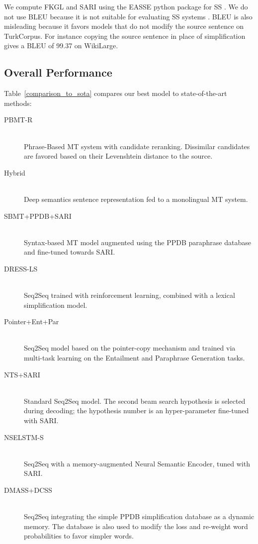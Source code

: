 \documentclass[10pt, a4paper]{article}
\begin{document}
    
    
    
    

We compute FKGL and SARI using the EASSE python package for SS \cite{alva2019easse}.
We do not use BLEU because it is not suitable for evaluating SS systems \cite{sulem2018bleu}.
BLEU is also misleading because it favors models that do not modify the source sentence \cite{xu2016optimizing} on TurkCorpus. For instance copying the source sentence in place of simplification gives a BLEU of 99.37 on WikiLarge.



\subsection{Overall Performance}



Table~\ref{comparison_to_sota} compares our best model to state-of-the-art methods:
\begin{description}
  \item [PBMT-R] \cite{wubben2012sentence}\\
  Phrase-Based MT system with candidate reranking. Dissimilar candidates are favored based on their Levenshtein distance to the source. 
  \item [Hybrid] \cite{narayan2014hybrid}\\
  Deep semantics sentence representation fed to a monolingual MT system.
  \item [SBMT+PPDB+SARI] \cite{xu2016optimizing}\\ Syntax-based MT model augmented using the PPDB paraphrase database \cite{pavlick2015ppdb} and fine-tuned towards SARI. 
  \item [DRESS-LS] \cite{zhang2017sentence}\\
  Seq2Seq trained with reinforcement learning, combined with a lexical simplification model. 
  \item [Pointer+Ent+Par] \cite{guo2018dynamic}\\
  Seq2Seq model based on the pointer-copy mechanism and trained via multi-task learning on the Entailment and Paraphrase Generation tasks. 
  \item [NTS+SARI] \cite{nisioi2017exploring}\\
  Standard Seq2Seq model. The second beam search hypothesis is selected during decoding; the hypothesis number is an hyper-parameter fine-tuned with SARI. 
  \item [NSELSTM-S] \cite{vu2018sentence}\\
  Seq2Seq with a memory-augmented Neural Semantic Encoder, tuned with SARI. 
  \item [DMASS+DCSS] \cite{zhao2018integrating}\\
  Seq2Seq integrating the simple PPDB simplification database \cite{pavlick2016simple} as a dynamic memory. The database is also used to modify the loss and re-weight word probabilities to favor simpler words.
\end{description}
\end{document}
